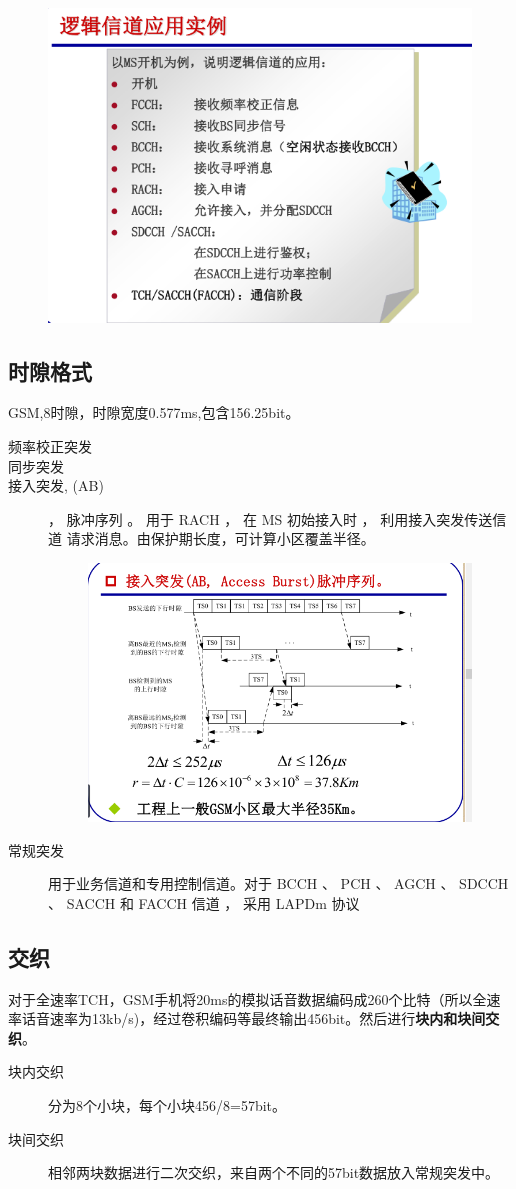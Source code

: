 \begin{figure}[H]
	\centering
	\includegraphics[width=0.7\linewidth]{figures/screenshot009}
	\caption{}
	\label{fig:screenshot009}
\end{figure}
\subsection{时隙格式}
GSM,8时隙，时隙宽度0.577ms,包含156.25bit。
\begin{description}
	\item[频率校正突发] 
	\item [同步突发]
	\item[  接入突发, (AB)] ， 脉冲序列 。 用于
	RACH ， 在 MS 初始接入时 ， 利用接入突发传送信道
	请求消息。由保护期长度，可计算小区覆盖半径。
	\begin{figure}[H]
		\centering
		\includegraphics[width=0.7\linewidth]{figures/screenshot010}
		\caption{}
		\label{fig:screenshot010}
	\end{figure}
	\item[常规突发] 用于业务信道和专用控制信道。对于 BCCH 、 PCH 、 AGCH 、 SDCCH 、 SACCH 和 FACCH
	信道 ， 采用 LAPDm 协议
\end{description}
\subsection{交织}
对于全速率TCH，GSM手机将20ms的模拟话音数据编码成260个比特（所以全速率话音速率为13kb/s)，经过卷积编码等最终输出456bit。然后进行\textbf{块内和块间交织}。
\begin{description}
	\item[块内交织] 分为8个小块，每个小块456/8=57bit。
	\item[块间交织] 相邻两块数据进行二次交织，来自两个不同的57bit数据放入常规突发中。
\end{description}
